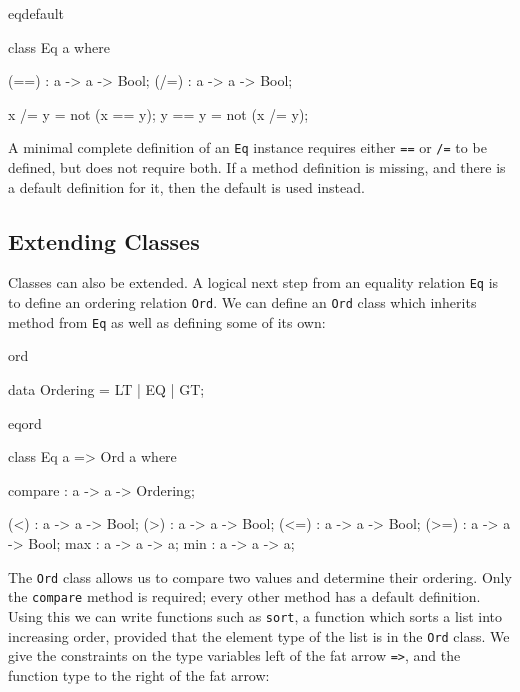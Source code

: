 \begin{SaveVerbatim}{eqdefault}

class Eq a where {
    (==) : a -> a -> Bool;
    (/=) : a -> a -> Bool;

    x /= y = not (x == y);
    y == y = not (x /= y);
}

\end{SaveVerbatim}

\noindent
A minimal complete definition of an \texttt{Eq} instance requires either \texttt{==}
or \texttt{/=} to be defined, but does not require both. If a method definition is
missing, and there is a default definition for it, then the default is used instead.

\subsection{Extending Classes}

Classes can also be extended. A logical next step from an equality relation \texttt{Eq}
is to define an ordering relation \texttt{Ord}. We can define an \texttt{Ord} class
which inherits method from \texttt{Eq} as well as defining some of its own:

\begin{SaveVerbatim}{ord}

data Ordering = LT | EQ | GT;

\end{SaveVerbatim}

\begin{SaveVerbatim}{eqord}

class Eq a => Ord a where {
    compare : a -> a -> Ordering;

    (<) : a -> a -> Bool;
    (>) : a -> a -> Bool;
    (<=) : a -> a -> Bool;
    (>=) : a -> a -> Bool;
    max : a -> a -> a;
    min : a -> a -> a;
}

\end{SaveVerbatim}

\noindent
The \texttt{Ord} class allows us to compare two values and determine their ordering. 
Only the \texttt{compare} method is required; every other method has a default definition.
Using
this we can write functions such as \texttt{sort}, a function which sorts a list into
increasing order, provided that the element type of the list is in the \texttt{Ord} class.
We give the constraints on the type variables left of the fat arrow \texttt{=>}, and the
function type to the right of the fat arrow:

